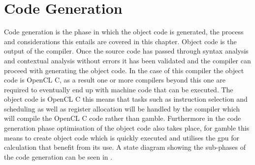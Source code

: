 \chapter{Code Generation}
Code generation is the phase in which the object code is generated, the process and considerations this entails are covered in this chapter.
Object code is the output of the compiler.
Once the source code has passed through syntax analysis and contextual analysis without errors it has been validated and the compiler can proceed with generating the object code.
In the case of this compiler the object code is OpenCL C, as a result one or more compilers beyond this one are required to eventually end up with machine code that can be executed.
The object code is OpenCL C this means that tasks such as instruction selection and scheduling as well as register allocation will be handled by the compiler which will compile the OpenCL C code rather than \gls{gamble}.
Furthermore in the code generation phase optimisation of the object code also takes place, for \gls{gamble} this means to create object code which is quickly executed and utilises the \acrshort{gpu} for calculation that benefit from its use.
A state diagram showing the sub-phases of the code generation can be seen in .


